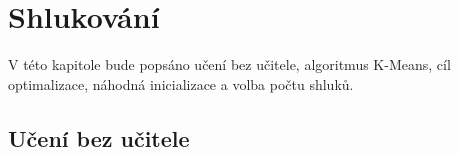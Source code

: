 

\chapter{Shlukování}
\label{sec:shlukovani}

\par{V této kapitole bude popsáno učení bez učitele, algoritmus K-Means, cíl optimalizace, náhodná inicializace a volba počtu shluků.}









\section{Učení bez učitele}

